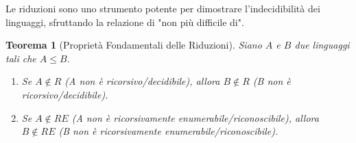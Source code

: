 \documentclass[a4paper]{article}
\newtheorem{theorem}{Teorema}[section] %
\begin{document}
Le riduzioni sono uno strumento potente per dimostrare l'indecidibilità dei linguaggi, sfruttando la relazione di "non più difficile di".

\begin{theorem}[Proprietà Fondamentali delle Riduzioni]
Siano $A$ e $B$ due linguaggi tali che $A \le B$.
\begin{enumerate}
    \item Se $A \notin R$ (A non è ricorsivo/decidibile), allora $B \notin R$ (B non è ricorsivo/decidibile).
    \item Se $A \notin RE$ (A non è ricorsivamente enumerabile/riconoscibile), allora $B \notin RE$ (B non è ricorsivamente enumerabile/riconoscibile).
\end{enumerate}
\end{theorem}
\end{document}
